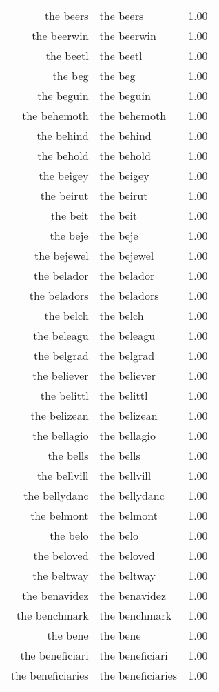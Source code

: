 \begin{table}[ht]
\begin{tabular}{rlr}
  the beers & the beers & 1.00 \\ 
  the beerwin & the beerwin & 1.00 \\ 
  the beetl & the beetl & 1.00 \\ 
  the beg & the beg & 1.00 \\ 
  the beguin & the beguin & 1.00 \\ 
  the behemoth & the behemoth & 1.00 \\ 
  the behind & the behind & 1.00 \\ 
  the behold & the behold & 1.00 \\ 
  the beigey & the beigey & 1.00 \\ 
  the beirut & the beirut & 1.00 \\ 
  the beit & the beit & 1.00 \\ 
  the beje & the beje & 1.00 \\ 
  the bejewel & the bejewel & 1.00 \\ 
  the belador & the belador & 1.00 \\ 
  the beladors & the beladors & 1.00 \\ 
  the belch & the belch & 1.00 \\ 
  the beleagu & the beleagu & 1.00 \\ 
  the belgrad & the belgrad & 1.00 \\ 
  the believer & the believer & 1.00 \\ 
  the belittl & the belittl & 1.00 \\ 
  the belizean & the belizean & 1.00 \\ 
  the bellagio & the bellagio & 1.00 \\ 
  the bells & the bells & 1.00 \\ 
  the bellvill & the bellvill & 1.00 \\ 
  the bellydanc & the bellydanc & 1.00 \\ 
  the belmont & the belmont & 1.00 \\ 
  the belo & the belo & 1.00 \\ 
  the beloved & the beloved & 1.00 \\ 
  the beltway & the beltway & 1.00 \\ 
  the benavidez & the benavidez & 1.00 \\ 
  the benchmark & the benchmark & 1.00 \\ 
  the bene & the bene & 1.00 \\ 
  the beneficiari & the beneficiari & 1.00 \\ 
  the beneficiaries & the beneficiaries & 1.00 \\ 

\end{tabular}
\end{table}
